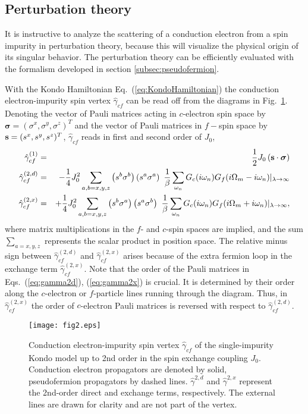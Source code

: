 \documentclass[12pt,twoside]{article}
\newcommand{\bsig}{\boldsymbol\sigma}
\newcommand{\Eq}[1]{Eq.~(\ref{#1})}
\newcommand{\Eqs}[2]{Eqs.~(\ref{#1}), (\ref{#2})}
\begin{document}
\subsection{Perturbation theory}
\label{subsec:PT}

It is instructive to analyze the scattering of a conduction electron from 
a spin impurity in perturbation theory,  
because this will visualize the physical origin of its singular behavior. 
The perturbation theory can be efficiently 
evaluated with the formalism developed in section \ref{subsec:pseudofermion}.

With the Kondo Hamiltonian \Eq{eq:KondoHamiltonian} the 
conduction electron-impurity spin vertex $\hat\gamma_{cf}$ can be read off
from the diagrams in Fig.~\ref{fig:PT}. 
Denoting the vector of Pauli matrices acting in $c$-electron spin space 
by $\bsig =(\sigma^x,\sigma^y,\sigma^z)^T$ and the vector of Pauli matrices 
in $f-$spin space by ${\bf s}=(s^x,s^y,s^z)^T$, $\hat\gamma_{cf}$ reads in 
first and second order of $J_0$,
\begin{eqnarray}
\hat\gamma_{cf}^{(1)}   &=& \frac{1}{2}J_0 \left( {\bf s}\cdot\bsig \right)
\label{eq:gamma1}\\
\hat\gamma_{cf}^{(2,d)} &=& -\frac{1}{4}J_0^2 
\sum_{a,b=x,y,z}\left( s^b \sigma^b \right)\left( s^a \sigma^a \right)\
\frac{1}{\beta} \sum_{\omega_n}
G_{c}(i\omega_n)G_{f}(i\Omega_m-i\omega_n)|_{\lambda\to\infty} 
\label{eq:gamma2d}\\
\hat\gamma_{cf}^{(2,x)} &=& + \frac{1}{4}J_0^2 
\sum_{a,b=x,y,z}\left( s^b \sigma^a \right)\left( s^a \sigma^b \right)\
\frac{1}{\beta} \sum_{\omega_n}
G_{c}(i\omega_n)G_{f}(i\Omega_m+i\omega_n)|_{\lambda\to\infty}, 
\label{eq:gamma2x}\end{eqnarray}
where matrix multiplications in the $f$- and $c$-spin spaces are implied,
and the sum $\sum_{a=x,y,z}$ represents the scalar product in position space. The 
relative minus sign between $\hat\gamma_{cf}^{(2,d)}$ and $\hat\gamma_{cf}^{(2,x)}$
arises because of the extra fermion loop in the exchange term 
$\hat\gamma_{cf}^{(2,x)}$. Note that the order of the Pauli matrices in 
\Eqs{eq:gamma2d}{eq:gamma2x} is crucial.
It is determined by their order along the $c$-electron or $f$-particle 
lines running through the diagram. Thus, in $\hat\gamma_{cf}^{(2,x)}$ the order 
of $c$-electron Pauli matrices is reversed with respect to  
$\hat\gamma_{cf}^{(2,d)}$.

\begin{figure}
\centering
\texttt{[image: fig2.eps]}
\caption{\label{fig:PT}
Conduction electron-impurity spin vertex $\hat\gamma_{cf}$ 
of the single-impurity Kondo model up to 2nd order in the spin exchange 
coupling $J_0$. Conduction electron propagators are denoted by solid, 
pseudofermion propagators by dashed lines. 
$\hat\gamma^{2,d}$ and $\hat\gamma^{2,x}$ represent the 2nd-order direct and 
exchange terms, respectively. The external lines 
are drawn for clarity and are not part of the vertex.
}
\end{figure}
\end{document}
